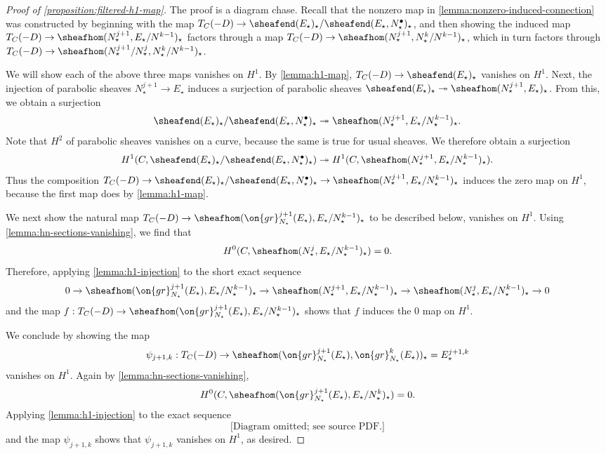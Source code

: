 \begin{proof}[Proof of \autoref{proposition:filtered-h1-map}]
	The proof is a diagram chase.
	Recall that the nonzero map in \autoref{lemma:nonzero-induced-connection} was
	constructed by beginning with the map $T_C(-D) \to
	\sheafend(E_\star)_\star/\sheafend(E_\star, N_\star^\bullet)_\star$, and then showing the induced map
	$T_C(-D) \to
	\sheafhom(N^{j+1}_\star, E_\star/N^{k-1})_\star$
	factors through a map
	$T_C(-D) \to
	\sheafhom(N^{j+1}_\star, N^k_\star/N^{k-1})_\star$,
	which in turn factors through
	$T_C(-D) \to
	\sheafhom(N^{j+1}_\star/N^j_\star, N^k_\star/N^{k-1})_\star$.

	We will show each of the above three maps vanishes on $H^1$.
	By \autoref{lemma:h1-map},
	$T_C(-D) \to
	\sheafend(E_\star)_\star$
	vanishes on $H^1$.
	Next, the injection of parabolic sheaves $N^{j+1}_\star \to E_\star$ induces a
surjection of parabolic sheaves $\sheafend(E_\star)_\star\twoheadrightarrow
\sheafhom(N_\star^{j+1}, E_\star)_\star$.
From this, we obtain
a surjection
$$\sheafend(E_\star)_\star /\sheafend(E_\star,N^\bullet_\star)_\star \twoheadrightarrow \sheafhom(N_\star^{j+1},
E_\star/N_\star^{k-1})_\star.$$
Note that $H^2$ of parabolic sheaves vanishes on a curve, because the same is true
for usual sheaves. We therefore obtain a surjection
$$H^1(C,\sheafend(E_\star)_\star/\sheafend(E_\star,N^\bullet_\star)_\star)\twoheadrightarrow H^1(C,\sheafhom(N_\star^{j+1},
E_\star/N_\star^{k-1})_\star).$$ Thus the composition $T_C(-D)\to
\sheafend(E_\star)_\star/\sheafend(E_\star,N^\bullet_\star)_\star\to
\sheafhom(N_\star^{j+1}, E_\star/N_\star^{k-1})_\star$ induces
the zero map on $H^1$, because the first map does by \autoref{lemma:h1-map}.

We next show the natural map $T_C(-D)\to \sheafhom(\on{gr}_{N_\star}^{j+1}(E_\star),
E_\star/N_\star^{k-1})_\star$ to be described below, vanishes on $H^1$.
Using \autoref{lemma:hn-sections-vanishing}, we find that
$$H^0(C, \sheafhom(N_\star^{j}, E_\star/N_\star^{k-1})_\star)=0.$$
Therefore, applying \autoref{lemma:h1-injection} to the short exact sequence $$0\to \sheafhom(\on{gr}_{N_\star}^{j+1}(E_\star),
E_\star/N_\star^{k-1})_\star \to \sheafhom(N_\star^{j+1},
E_\star/N_\star^{k-1})_\star \to
\sheafhom(N_\star^{j}, E_\star/N_\star^{k-1})_\star \to 0$$
and the map $f: T_C(-D) \to \sheafhom(\on{gr}_{N_\star}^{j+1}(E_\star),
E_\star/N_\star^{k-1})_\star$
shows that $f$ induces the $0$ map on $H^1$.

We conclude by showing the map $$\psi_{j+1, k}: T_C(-D)\to
\sheafhom(\on{gr}^{j+1}_{N_\star}(E_\star), \on{gr}^k_{N_\star}(E_\star))_\star=E_\star^{j+1,k}$$
vanishes on $H^1$.
Again by \autoref{lemma:hn-sections-vanishing},
$$H^0(C, \sheafhom(\on{gr}_{N_\star}^{j+1}(E_\star),
E_\star/N_\star^k)_\star) = 0.$$
Applying \autoref{lemma:h1-injection} to the exact sequence
\begin{equation}
\text{[Diagram omitted; see source PDF.]}
\end{equation}
and the map $\psi_{j+1, k}$ shows that $\psi_{j+1,k}$ vanishes on $H^1$, as
desired.
\end{proof}

